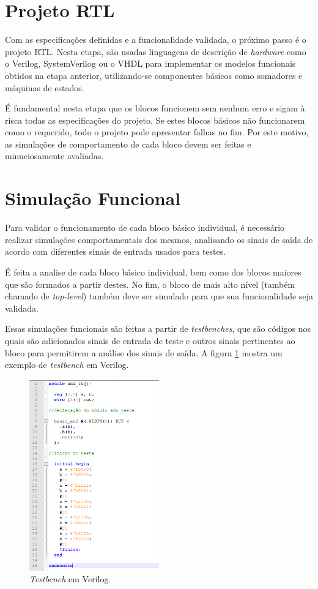 \section{Projeto RTL}

Com as especificações definidas e a funcionalidade validada, o próximo passo é o projeto RTL. Nesta etapa, são usadas linguagens de descrição de \textit{hardware} como o Verilog, SystemVerilog ou o VHDL para implementar os modelos funcionais obtidos na etapa anterior, utilizando-se componentes básicos como somadores e máquinas de estados.

É fundamental nesta etapa que os blocos funcionem sem nenhum erro e sigam à risca todas as especificações do projeto. Se estes blocos básicos não funcionarem como o requerido, todo o projeto pode apresentar falhas no fim. Por este motivo, as simulações de comportamento de cada bloco devem ser feitas e minuciosamente avaliadas.

\section{Simulação Funcional}

Para validar o funcionamento de cada bloco básico individual, é necessário realizar simulações comportamentais dos mesmos, analisando os sinais de saída de acordo com diferentes sinais de entrada usados para testes.

É feita a analise de cada bloco básico individual, bem como dos blocos maiores que são formados a partir destes. No fim, o bloco de mais alto nível (também chamado de \textit{top-level}) também deve ser simulado para que sua funcionalidade seja validada.

Essas simulações funcionais são feitas a partir de \textit{testbenches}, que são códigos nos quais são adicionados sinais de entrada de teste e outros sinais pertinentes ao bloco para permitirem a análise dos sinais de saída. A figura \ref{testb} mostra um exemplo de \textit{testbench } em Verilog.

\begin{figure}[h!]
  \centering
  \includegraphics[width=0.5\textwidth]{figuras/test.PNG}
  \caption{\textit{Testbench} em Verilog.}
  \label{testb}
\end{figure}

